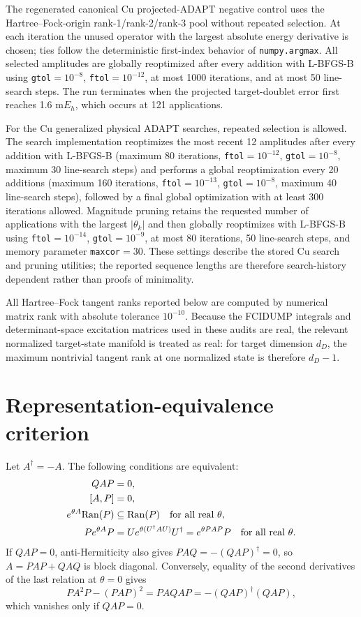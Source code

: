 \documentclass[
 aip,
 jcp,
 amsmath,amssymb,
 preprint
]{revtex4-2}
\begin{document}
The regenerated canonical Cu projected-ADAPT negative control uses the Hartree--Fock-origin rank-1/rank-2/rank-3 pool without repeated selection.
At each iteration the unused operator with the largest absolute energy derivative is chosen; ties follow the deterministic first-index behavior of \texttt{numpy.argmax}.
All selected amplitudes are globally reoptimized after every addition with L-BFGS-B using \texttt{gtol}$=10^{-8}$, \texttt{ftol}$=10^{-12}$, at most 1000 iterations, and at most 50 line-search steps.
The run terminates when the projected target-doublet error first reaches 1.6 m$E_h$, which occurs at 121 applications.

For the Cu generalized physical ADAPT searches, repeated selection is allowed.
The search implementation reoptimizes the most recent 12 amplitudes after every addition with L-BFGS-B (maximum 80 iterations, \texttt{ftol}$=10^{-12}$, \texttt{gtol}$=10^{-8}$, maximum 30 line-search steps) and performs a global reoptimization every 20 additions (maximum 160 iterations, \texttt{ftol}$=10^{-13}$, \texttt{gtol}$=10^{-8}$, maximum 40 line-search steps), followed by a final global optimization with at least 300 iterations allowed.
Magnitude pruning retains the requested number of applications with the largest $|\theta_k|$ and then globally reoptimizes with L-BFGS-B using \texttt{ftol}$=10^{-14}$, \texttt{gtol}$=10^{-9}$, at most 80 iterations, 50 line-search steps, and memory parameter \texttt{maxcor}$=30$.
These settings describe the stored Cu search and pruning utilities; the reported sequence lengths are therefore search-history dependent rather than proofs of minimality.

All Hartree--Fock tangent ranks reported below are computed by numerical matrix rank with absolute tolerance $10^{-10}$.
Because the FCIDUMP integrals and determinant-space excitation matrices used in these audits are real, the relevant normalized target-state manifold is treated as real: for target dimension $d_D$, the maximum nontrivial tangent rank at one normalized state is therefore $d_D-1$.

\section{Representation-equivalence criterion}

Let $A^\dagger=-A$.
The following conditions are equivalent:
\begin{align}
QAP&=0,\\
[A,P]&=0,\\
e^{\theta A}{\rm Ran}(P)&\subseteq{\rm Ran}(P)
\quad\text{for all real }\theta,\\
P e^{\theta A}P
&=
Ue^{\theta(U^\dagger A U)}U^\dagger
=
e^{\theta PAP}P
\quad\text{for all real }\theta.
\end{align}
If $QAP=0$, anti-Hermiticity also gives
$PAQ=-(QAP)^\dagger=0$, so $A=PAP+QAQ$ is block diagonal.
Conversely, equality of the second derivatives of the last relation at $\theta=0$ gives
\begin{equation}
PA^2P-(PAP)^2
=
PAQAP
=
-(QAP)^\dagger(QAP),
\end{equation}
which vanishes only if $QAP=0$.
\end{document}

